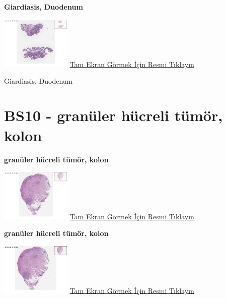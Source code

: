 \documentclass[
  letterpaper,
  DIV=11,
  numbers=noendperiod]{scrreprt}
\begin{document}
\textbf{Giardiasis, Duodenum}

\href{https://images.patolojiatlasi.com/BS9/HE2.html}{\includegraphics[width=0.25\textwidth,height=\textheight]{./screenshots/BS9-HE2_screenshot.png}}
\href{https://images.patolojiatlasi.com/BS9/HE2.html}{Tam Ekran Görmek
İçin Resmi Tıklayın}

\begin{tcolorbox}[enhanced jigsaw, left=2mm, toprule=.15mm, rightrule=.15mm, bottomrule=.15mm, leftrule=.75mm, colback=white, colframe=quarto-callout-tip-color-frame, toptitle=1mm, breakable, titlerule=0mm, colbacktitle=quarto-callout-tip-color!10!white, bottomtitle=1mm, title=\textcolor{quarto-callout-tip-color}{\faLightbulb}\hspace{0.5em}{Tanı}, arc=.35mm, opacitybacktitle=0.6, opacityback=0, coltitle=black]

Giardiasis, Duodenum

\end{tcolorbox}

\hypertarget{sec-BS10}{%
\section{BS10 - granüler hücreli tümör, kolon}\label{sec-BS10}}

\textbf{granüler hücreli tümör, kolon}

\href{https://images.patolojiatlasi.com/BS10/HE1.html}{\includegraphics[width=0.25\textwidth,height=\textheight]{./screenshots/BS10-HE1_screenshot.png}}
\href{https://images.patolojiatlasi.com/BS10/HE1.html}{Tam Ekran Görmek
İçin Resmi Tıklayın}

\textbf{granüler hücreli tümör, kolon}

\href{https://images.patolojiatlasi.com/BS10/HE2.html}{\includegraphics[width=0.25\textwidth,height=\textheight]{./screenshots/BS10-HE2_screenshot.png}}
\href{https://images.patolojiatlasi.com/BS10/HE2.html}{Tam Ekran Görmek
İçin Resmi Tıklayın}
\end{document}

